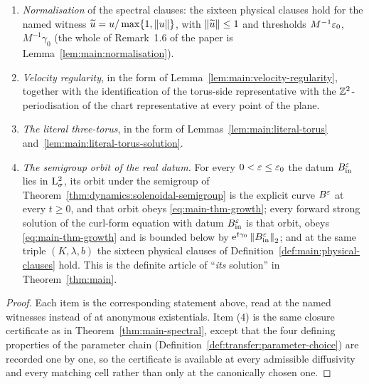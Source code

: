 \begin{theorem}
\begin{enumerate}
      canonically chosen matching cell but at \emph{every} one: for every
      $0<\eps\leq\eps_0$ and every cell index $n$ with
      $\eps/\ell_n^2\in I$, the axial index $K_n$ is non-zero and carries an
      eigenpair, of the reduced and of the auxiliary operator, with
      $\re\lambda\geq\gamma_0$; and the Riesz-projection form of the
      proposition holds at every such cell as well.
    \item \emph{Normalisation} of the spectral clauses: the sixteen physical clauses hold
      for the named witness $\widetilde u=u/\max\{1,\left\|u\right\|\}$, with
      $\left\|\widetilde u\right\|\leq1$ and thresholds $M^{-1}\varepsilon_0$, $M^{-1}\gamma_0$ (the whole of
      Remark~1.6 of the paper is Lemma~\ref{lem:main:normalisation}).
    \item \emph{Velocity regularity}, in the form of
      Lemma~\ref{lem:main:velocity-regularity}, together with the
      identification of the torus-side representative with the
      $\mathbb{Z}^2$-periodisation of the chart representative at every point of the
      plane.
    \item \emph{The literal three-torus}, in the form of
      Lemmas~\ref{lem:main:literal-torus} and~\ref{lem:main:literal-torus-solution}.
    \item \emph{The semigroup orbit of the real datum.}  For every
      $0<\eps\leq\eps_0$ the datum $B_{\rm in}^\varepsilon$ lies in $\mathrm{L}^2_\sigma$, its orbit
      under the semigroup of Theorem~\ref{thm:dynamics:solenoidal-semigroup} is the
      explicit curve $B^\varepsilon$ at every $t\geq0$, and that orbit obeys
      \eqref{eq:main-thm-growth}; every forward strong solution of the curl-form equation
      with datum $B_{\rm in}^\varepsilon$ is that orbit, obeys \eqref{eq:main-thm-growth} and is
      bounded below by $\mathrm{e}^{t\gamma_0}\left\|B_{\rm in}^\varepsilon\right\|_2$; and at the same triple
      $(K,\lambda,b)$ the sixteen physical clauses of
      Definition~\ref{def:main:physical-clauses} hold.  This is the definite
      article of ``\emph{its} solution'' in Theorem~\ref{thm:main}.
  \end{enumerate}
\end{theorem}

\begin{proof}
  \leanok
  Each item is the corresponding statement above, read at the named witnesses
  instead of at anonymous existentials.  Item (4) is the same closure
  certificate as in Theorem~\ref{thm:main-spectral}, except that the four
  defining properties of the parameter chain
  (Definition~\ref{def:transfer:parameter-choice}) are recorded one by one, so
  the certificate is available at every admissible diffusivity and every
  matching cell rather than only at the canonically chosen one.
\end{proof}

